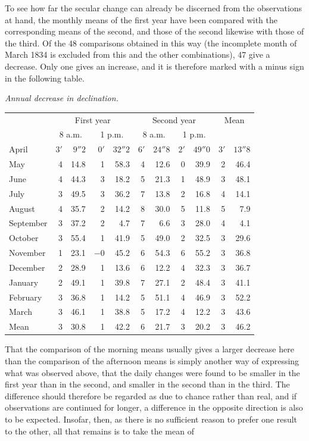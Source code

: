 To see how far the secular change can already be discerned from the observations at hand, the monthly means of the first year have been compared with the corresponding means of the second, and those of the second likewise with those of the third. Of the 48 comparisons obtained in this way (the incomplete month of March 1834 is excluded from this and the other combinations), 47 give a decrease. Only one gives an increase, and it is therefore marked with a minus sign in the following table.
\begin{center}\small\setlength{\tabcolsep}{3pt}
\textit{Annual decrease in declination.}\par\smallskip
\begin{tabular}{l||rr|rr||rr|rr||rr}
&\multicolumn{4}{c||}{First year}&\multicolumn{4}{c||}{Second year}&\multicolumn{2}{c}{Mean}\\
&\multicolumn{2}{c|}{8 a.m.}&\multicolumn{2}{c||}{1 p.m.}&\multicolumn{2}{c|}{8 a.m.}&\multicolumn{2}{c||}{1 p.m.}&&\\\hline\hline
April&$3'$&$9''2$&$0'$&$32''2$&$6'$&$24''8$&$2'$&$49''0$&$3'$&$13''8$\\
May&4&14.8&1&58.3&4&12.6&0&39.9&2&46.4\\
June&4&44.3&3&18.2&5&21.3&1&48.9&3&48.1\\
July&3&49.5&3&36.2&7&13.8&2&16.8&4&14.1\\
August&4&35.7&2&14.2&8&30.0&5&11.8&5&7.9\\
September&3&37.2&2&4.7&7&6.6&3&28.0&4&4.1\\
October&3&55.4&1&41.9&5&49.0&2&32.5&3&29.6\\
November&1&23.1&$-0$&45.2&6&54.3&6&55.2&3&36.8\\
December&2&28.9&1&13.6&6&12.2&4&32.3&3&36.7\\
January&2&49.1&1&39.8&7&27.1&2&48.4&3&41.1\\
February&3&36.8&1&14.2&5&51.1&4&46.9&3&52.2\\
March&3&46.1&1&38.8&5&17.2&4&12.2&3&43.6\\\hline\hline
Mean&3&30.8&1&42.2&6&21.7&3&20.2&3&46.2
\end{tabular}
\end{center}
That the comparison of the morning means usually gives a larger decrease here than the comparison of the afternoon means is simply another way of expressing what was observed above, that the daily changes were found to be smaller in the first year than in the second, and smaller in the second than in the third. The difference should therefore be regarded as due to chance rather than real, and if observations are continued for longer, a difference in the opposite direction is also to be expected. Insofar, then, as there is no sufficient reason to prefer one result to the other, all that remains is to take the mean of
